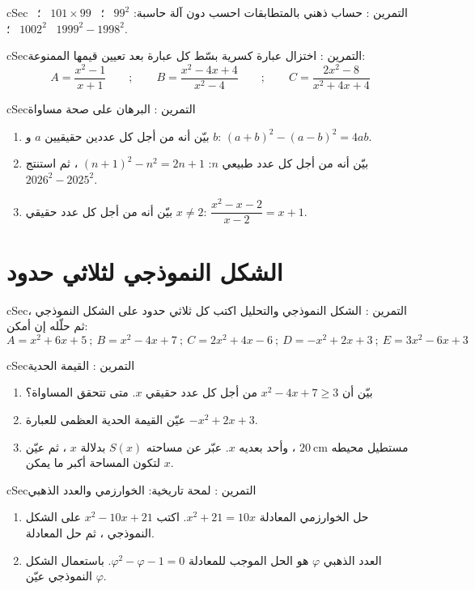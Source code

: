 \documentclass[12pt,a4paper]{article}
\newenvironment{BOX}[2]{\begin{otherlanguage}{english}\begin{arbox}{#1}{#2}}{\end{arbox}\end{otherlanguage}}
\newcounter{exo}
\newenvironment{tamrin}[1]{\stepcounter{exo}\begin{BOX}{cSec}{التمرين \theexo: #1}}{\end{BOX}}
\begin{document}
\begin{tamrin}{حساب ذهني بالمتطابقات}
احسب دون آلة حاسبة: \quad $99^2$ \ ؛ \ $101\times99$ \ ؛ \ $1002^2$ \ ؛ \ $1999^2-1998^2$.
\end{tamrin}

\begin{tamrin}{اختزال عبارة كسرية}
بسّط كل عبارة بعد تعيين قيمها الممنوعة:
\[A=\frac{x^2-1}{x+1}\qquad;\qquad B=\frac{x^2-4x+4}{x^2-4}\qquad;\qquad C=\frac{2x^2-8}{x^2+4x+4}\]
\end{tamrin}

\begin{tamrin}{البرهان على صحة مساواة}
\begin{enumerate}
\item بيّن أنه من أجل كل عددين حقيقيين $a$ و $b$: $(a+b)^2-(a-b)^2=4ab$.
\item بيّن أنه من أجل كل عدد طبيعي $n$: $(n+1)^2-n^2=2n+1$ ، ثم استنتج $2026^2-2025^2$.
\item بيّن أنه من أجل كل عدد حقيقي $x\neq2$: $\dfrac{x^2-x-2}{x-2}=x+1$.
\end{enumerate}
\end{tamrin}

\section{الشكل النموذجي لثلاثي حدود}
\begin{tamrin}{الشكل النموذجي والتحليل}
اكتب كل ثلاثي حدود على الشكل النموذجي ، ثم حلّله إن أمكن:
\[A=x^2+6x+5\ ;\ B=x^2-4x+7\ ;\ C=2x^2+4x-6\ ;\ D=-x^2+2x+3\ ;\ E=3x^2-6x+3\]
\end{tamrin}

\begin{tamrin}{القيمة الحدية}
\begin{enumerate}
\item بيّن أن $x^2-4x+7\geqslant3$ من أجل كل عدد حقيقي $x$. متى تتحقق المساواة؟
\item عيّن القيمة الحدية العظمى للعبارة $-x^2+2x+3$.
\item مستطيل محيطه $20\ \text{cm}$ ، وأحد بعديه $x$. عبّر عن مساحته $S(x)$ بدلالة $x$ ، ثم عيّن $x$ لتكون المساحة أكبر ما يمكن.
\end{enumerate}
\end{tamrin}

\begin{tamrin}{لمحة تاريخية: الخوارزمي والعدد الذهبي}
\begin{enumerate}
\item حل الخوارزمي المعادلة $x^2+21=10x$. اكتب $x^2-10x+21$ على الشكل النموذجي ، ثم حل المعادلة.
\item العدد الذهبي $\varphi$ هو الحل الموجب للمعادلة $\varphi^2-\varphi-1=0$. باستعمال الشكل النموذجي عيّن $\varphi$.
\end{enumerate}
\end{tamrin}
\end{document}
